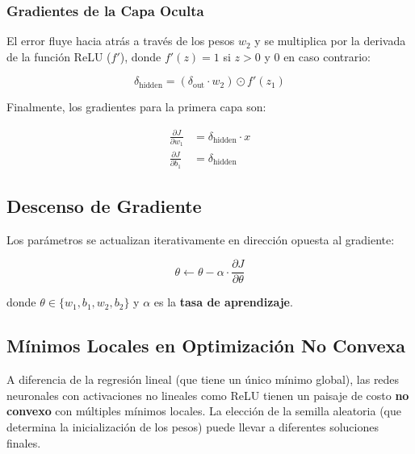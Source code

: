 \documentclass[12pt,a4paper]{article}
\theoremstyle{definition}
\begin{document}
\subsubsection{Gradientes de la Capa Oculta}

El error fluye hacia atr\'{a}s a trav\'{e}s de los pesos $w_2$ y se multiplica por la derivada de la funci\'{o}n ReLU ($f'$), donde $f'(z) = 1$ si $z > 0$ y $0$ en caso contrario:

\begin{equation}\label{eq:delta_hidden}
\delta_{\text{hidden}} = (\delta_{\text{out}} \cdot w_2) \odot f'(z_1)
\end{equation}

Finalmente, los gradientes para la primera capa son:

\begin{align}
\frac{\partial J}{\partial w_1} &= \delta_{\text{hidden}} \cdot x \label{eq:grad_w1} \\
\frac{\partial J}{\partial b_1} &= \delta_{\text{hidden}} \label{eq:grad_b1}
\end{align}

\subsection{Descenso de Gradiente}

Los par\'{a}metros se actualizan iterativamente en direcci\'{o}n opuesta al gradiente:

\begin{equation}\label{eq:update}
\theta \leftarrow \theta - \alpha \cdot \frac{\partial J}{\partial \theta}
\end{equation}

donde $\theta \in \{w_1, b_1, w_2, b_2\}$ y $\alpha$ es la \textbf{tasa de aprendizaje}.

\subsection{M\'{i}nimos Locales en Optimizaci\'{o}n No Convexa}

A diferencia de la regresi\'{o}n lineal (que tiene un \'unico m\'{i}nimo global), las redes neuronales con activaciones no lineales como ReLU tienen un paisaje de costo \textbf{no convexo} con m\'{u}ltiples m\'{i}nimos locales. La elecci\'{o}n de la semilla aleatoria (que determina la inicializaci\'{o}n de los pesos) puede llevar a diferentes soluciones finales.

\end{document}
